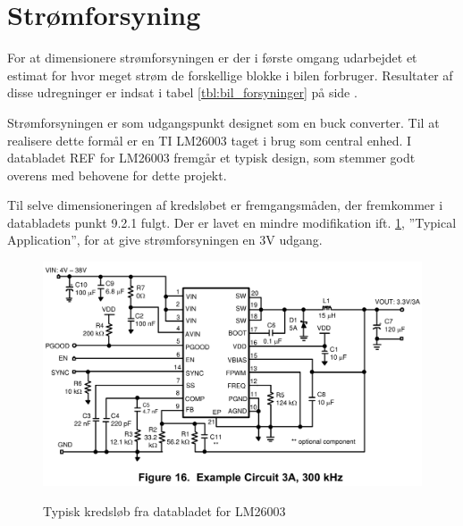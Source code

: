 \section{Strømforsyning}

For at dimensionere strømforsyningen er der i første omgang udarbejdet et estimat for hvor meget strøm de forskellige blokke i bilen forbruger. 
Resultater af disse udregninger er indsat i tabel \ref{tbl:bil_forsyninger} på side \pageref{tbl:bil_forsyninger}.

Strømforsyningen er som udgangspunkt designet som en buck converter.%
Til at realisere dette formål er en TI LM26003 taget i brug som central enhed.
I databladet REF for LM26003 fremgår et typisk design, som stemmer godt overens med behovene for dette projekt.

Til selve dimensioneringen af kredsløbet er fremgangsmåden, der fremkommer i databladets punkt 9.2.1 fulgt. Der er lavet en mindre modifikation ift. \ref{fig:lm26003fig16}, ''Typical Application'', for at give strømforsyningen en 3V udgang.

\begin{figure}[h]
\centering
\includegraphics[width=\textwidth* 9/10]{../fig/billeder/lm26003fig16}
\label{fig:lm26003fig16}
\caption{Typisk kredsløb fra databladet for LM26003}
\end{figure}

